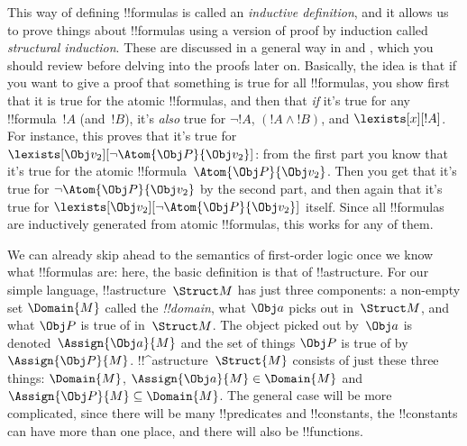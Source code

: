 This way of defining !!{formula}s is called an \emph{inductive
definition}, and it allows us to prove things about !!{formula}s using
a version of proof by induction called \emph{structural induction}.
These are discussed in a general way in  and
, which you should review before delving
into the proofs later on. Basically, the idea is that if you want to
give a proof that something is true for all !!{formula}s, you show
first that it is true for the atomic !!{formula}s, and then that
\emph{if} it's true for any !!{formula}~$!A$ (and~$!B$), it's
\emph{also} true for $\lnot !A$, $(!A \land !B)$, and
$\lexists[x][!A]$. For instance, this proves that it's true for
$\lexists[\Obj v_2][\lnot \Atom{\Obj P}{\Obj v_2}]$: from the first
part you know that it's true for the atomic !!{formula}~$\Atom{\Obj
P}{\Obj v_2}$. Then you get that it's true for $\lnot \Atom{\Obj
P}{\Obj v_2}$ by the second part, and then again that it's true for
$\lexists[\Obj v_2][\lnot \Atom{\Obj P}{\Obj v_2}]$ itself. Since all
!!{formula}s are inductively generated from atomic !!{formula}s, this
works for any of them.







We can already skip ahead to the semantics of first-order logic once
we know what !!{formula}s are: here, the basic definition is that of 
!!a{structure}. For our simple language, !!a{structure}~$\Struct M$ has
just three components: a non-empty set $\Domain{M}$ called the
\emph{!!{domain}}, what $\Obj a$ picks out in~$\Struct M$, and what
$\Obj P$ is true of in~$\Struct M$.  The object picked out by~$\Obj a$
is denoted~$\Assign{\Obj a}{M}$ and the set of things $\Obj P$ is true
of by~$\Assign{\Obj P}{M}$. !!^a{structure}~$\Struct{M}$ consists of
just these three things: $\Domain{M}$, $\Assign{\Obj a}{M} \in
\Domain{M}$ and $\Assign{\Obj P}{M} \subseteq \Domain{M}$. The general
case will be more complicated, since there will be many !!{predicate}s
and !!{constant}s, the !!{constant}s can have more than one place, and
there will also be !!{function}s.

